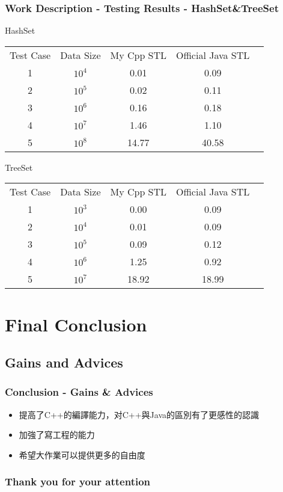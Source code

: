 \documentclass[table, usenames,dvipsnames,svgnames]{beamer}
\begin{document}
\begin{frame}

\frametitle{Work Description - Testing Results - HashSet\&TreeSet}


\pause
\begin{center}
HashSet\\
\vspace{2mm}
\begin{tabular}{ccccc}
Test Case&Data Size&My Cpp STL & Official Java STL\\
1&$10^4$&0.01&0.09\\
2&$10^5$&0.02&0.11\\
3&$10^6$&0.16&0.18\\
4&$10^7$&1.46&1.10\\
5&$10^8$&14.77&40.58\\ 
\end{tabular}
\end{center}

\pause
\begin{center}
TreeSet\\
\vspace{2mm}
\begin{tabular}{ccccc}
Test Case&Data Size&My Cpp STL & Official Java STL\\
1&$10^3$&0.00&0.09\\
2&$10^4$&0.01&0.09\\
3&$10^5$&0.09&0.12\\
4&$10^6$&1.25&0.92\\
5&$10^7$&18.92&18.99\\ 
\end{tabular}
\end{center}

\end{frame}

\section{Final Conclusion}
\subsection{Gains and Advices}

\begin{frame}

\frametitle{Conclusion - Gains \& Advices}


\pause
\begin{itemize}
\item 提高了C++的編譯能力，对C++與Java的區別有了更感性的認識 \pause
\vspace{3mm}

\item 加強了寫工程的能力 \pause
\vspace{3mm}

\item 希望大作業可以提供更多的自由度 
\end{itemize}

\end{frame}

\begin{frame}
\frametitle{Thank you for your attention}
\end{frame}
\end{document}
